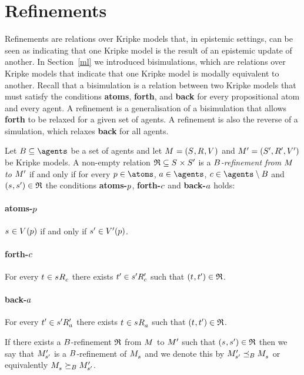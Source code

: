 \section{Refinements}\label{rml-refinements}

Refinements are relations over Kripke models that, in epistemic settings, can be seen as indicating that one Kripke model is the result of an epistemic update of another.
In Section~\ref{ml} we introduced bisimulations, which are relations over Kripke models that indicate that one Kripke model is modally equivalent to another.
Recall that a bisimulation is a relation between two Kripke models that must satisfy the conditions {\bf atoms}, {\bf forth}, and {\bf back} for every propositional atom and every agent.
A refinement is a generalisation of a bisimulation that allows {\bf forth} to be relaxed for a given set of agents.
A refinement is also the reverse of a simulation, which relaxes {\bf back} for all agents.

\begin{definition}[Refinements]\label{refinements}
Let $\agentsB \subseteq \agents$ be a set of agents and let $\kModelAndTuple$ and $\kModelAndTupleP$ be Kripke models.
A non-empty relation $\refinement \subseteq \kStates \times \kStatesP$ is a {\em $B$-refinement from $\kModel$ to ${M^{\prime}_{}}$} if and only if for every $\atomP \in \atoms$, $\agentA \in \agents$, $\agentC \in \agents \setminus \agentsB$ and $(\kStateS, \kStateSP) \in \refinement$ the conditions {\bf atoms-$p$}, {\bf forth-$c$} and {\bf back-$a$} holds:

\paragraph{atoms-$p$}
$\kStateS \in \kValuation(\atomP)$ if and only if ${s}^{\prime} \in {V^{\prime}}(p)$.

\paragraph{forth-$c$}
For every $\kStateT \in \kSuccessorsC{\kStateS}$ there exists ${t}^{\prime} \in {{s}^{\prime}} {R^{\prime}_{c}}$ such that $(\kStateT, \kStateTP) \in \refinement$.

\paragraph{back-$a$}
For every ${t}^{\prime} \in {{s}^{\prime}} {R^{\prime}_{a}}$ there exists $\kStateT \in \kSuccessorsA{\kStateS}$ such that $(\kStateT, \kStateTP) \in \refinement$.

If there exists a $B$-refinement $\mathfrak{R}$ from $\kModel$ to ${M^{\prime}_{}}$ such that $(\kStateS, \kStateSP) \in \refinement$ then we say that ${M^{\prime}_{{s}^{\prime}}}$ is a $B$-refinement of $\kPModel{\kStateS}$ and we denote this by $\kPModelP{\kStateSP} \refinesBs \kPModel{\kStateS}$ or equivalently $\kPModel{\kStateS} \simulatesBs \kPModelP{\kStateSP}$.
\end{definition}


